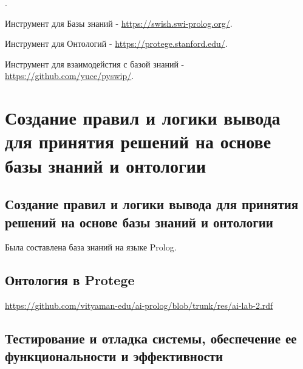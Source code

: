 \documentclass{article}
\begin{document}
.

Инструмент для Базы знаний -
\url{https://swish.swi-prolog.org/}.

Инструмент для Онтологий -
\url{https://protege.stanford.edu/}.

Инструмент для взаимодейстия с базой знаний -
\url{https://github.com/yuce/pyswip/}.


\section{Создание правил и логики вывода для принятия решений на основе базы знаний и онтологии}

\subsection{Создание правил и логики вывода для принятия решений на основе базы знаний и онтологии}

Была составлена база знаний на языке Prolog.

















\subsection{Онтология в Protege}

\url{https://github.com/vityaman-edu/ai-prolog/blob/trunk/res/ai-lab-2.rdf}

\subsection{Тестирование и отладка системы, обеспечение ее функциональности и эффективности}
\end{document}
